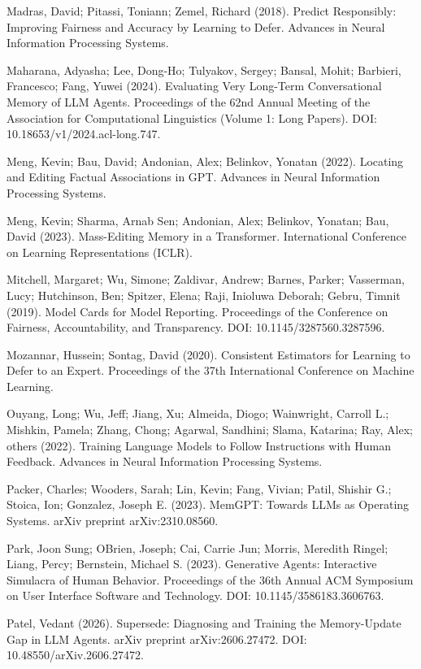 Madras, David; Pitassi, Toniann; Zemel, Richard (2018). Predict
Responsibly: Improving Fairness and Accuracy by Learning to Defer.
Advances in Neural Information Processing Systems.

Maharana, Adyasha; Lee, Dong-Ho; Tulyakov, Sergey; Bansal, Mohit;
Barbieri, Francesco; Fang, Yuwei (2024). Evaluating Very Long-Term
Conversational Memory of LLM Agents. Proceedings of the 62nd Annual
Meeting of the Association for Computational Linguistics (Volume 1: Long
Papers). DOI: 10.18653/v1/2024.acl-long.747.

Meng, Kevin; Bau, David; Andonian, Alex; Belinkov, Yonatan (2022).
Locating and Editing Factual Associations in GPT. Advances in Neural
Information Processing Systems.

Meng, Kevin; Sharma, Arnab Sen; Andonian, Alex; Belinkov, Yonatan; Bau,
David (2023). Mass-Editing Memory in a Transformer. International
Conference on Learning Representations (ICLR).

Mitchell, Margaret; Wu, Simone; Zaldivar, Andrew; Barnes, Parker;
Vasserman, Lucy; Hutchinson, Ben; Spitzer, Elena; Raji, Inioluwa
Deborah; Gebru, Timnit (2019). Model Cards for Model Reporting.
Proceedings of the Conference on Fairness, Accountability, and
Transparency. DOI: 10.1145/3287560.3287596.

Mozannar, Hussein; Sontag, David (2020). Consistent Estimators for
Learning to Defer to an Expert. Proceedings of the 37th International
Conference on Machine Learning.

Ouyang, Long; Wu, Jeff; Jiang, Xu; Almeida, Diogo; Wainwright, Carroll
L.; Mishkin, Pamela; Zhang, Chong; Agarwal, Sandhini; Slama, Katarina;
Ray, Alex; others (2022). Training Language Models to Follow
Instructions with Human Feedback. Advances in Neural Information
Processing Systems.

Packer, Charles; Wooders, Sarah; Lin, Kevin; Fang, Vivian; Patil,
Shishir G.; Stoica, Ion; Gonzalez, Joseph E. (2023). MemGPT: Towards
LLMs as Operating Systems. arXiv preprint arXiv:2310.08560.

Park, Joon Sung; O\textquotesingle Brien, Joseph; Cai, Carrie Jun;
Morris, Meredith Ringel; Liang, Percy; Bernstein, Michael S. (2023).
Generative Agents: Interactive Simulacra of Human Behavior. Proceedings
of the 36th Annual ACM Symposium on User Interface Software and
Technology. DOI: 10.1145/3586183.3606763.

Patel, Vedant (2026). Supersede: Diagnosing and Training the
Memory-Update Gap in LLM Agents. arXiv preprint arXiv:2606.27472. DOI:
10.48550/arXiv.2606.27472.

